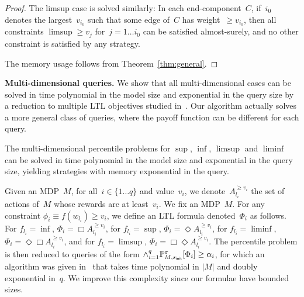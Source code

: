 \documentclass{llncs}
\newcommand{\initState}{\ensuremath{s_{{\sf init}}} }
\newcommand*{\pr}{\mathbb{P}}
\begin{document}
\begin{proof}
  The limsup case is solved similarly: In each end-component~$C$, if~$i_0$ denotes the largest~$v_{i_0}$ such that some edge of~$C$ has weight~$\geq v_{i_0}$, then all constraints $\limsup\geq v_j$ 
  for~$j=1\ldots i_0$ can be satisfied almost-surely, and no other constraint is satisfied by any strategy.
  
  The memory usage follows from Theorem~\ref{thm:general}.
\end{proof}



\smallskip\noindent\textbf{Multi-dimensional queries.}
\label{subsection:multi-simple}
We show that all multi-dimensional cases can be solved in time polynomial in the model size and exponential in the query size by a reduction to multiple LTL objectives studied in~\cite{EKVY-lmcs08}. 
Our algorithm actually solves a more general class of queries, where the payoff function can be different for each query.

\begin{theorem}
\label{thm:quant_reg_multi_dim}
  The multi-dimensional percentile problems for $\sup$, $\inf$, $\limsup$ and $\liminf$ can be solved in time polynomial in the model size and exponential in the query size,
  yielding strategies with memory exponential in the query.
\end{theorem}

Given an MDP~$M$, for all~$i\in\{1\ldots q\}$ and value~$v_i$, we denote~$A_{l_i}^{\geq v_i}$ the set of actions of~$M$ whose rewards are at least~$v_i$.  We fix an MDP~$M$. 
 For any constraint $\phi_i \equiv f(w_{l_i})\geq v_i$, we define an LTL formula denoted~$\Phi_i$ as follows. For $f_{l_i}=\inf$, $\Phi_i = \Box A_{l_i}^{\geq v_i}$, for $f_{l_i}=\sup$, $\Phi_i = \Diamond A_{l_i}^{\geq v_i}$, for $f_{l_i} = \liminf$, $\Phi_i = \Diamond \Box A_{l_i}^{\geq v_i}$, and for $f_{l_i} = \limsup$, $\Phi_i = \Box \Diamond A_{l_i}^{\geq v_i}$.
The percentile problem is then reduced to queries of the form $\wedge_{i=1}^q \pr_{M,\initState}^\sigma[\Phi_i]\geq \alpha_i$, 
for which an algorithm was given in~\cite{EKVY-lmcs08} that takes time polynomial in $|M|$ and doubly exponential in~$q$. We improve this complexity since our formulae have bounded sizes.
\end{document}
